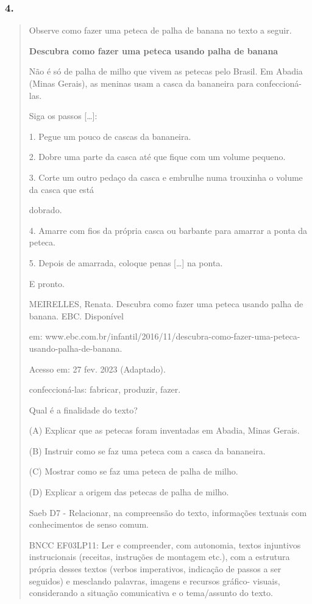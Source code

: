 \subsubsection{4. }\label{section-87}

\begin{quote}
Observe como fazer uma peteca de palha de banana no texto a seguir.

\textbf{Descubra como fazer uma peteca usando palha de banana}

Não é só de palha de milho que vivem as petecas pelo Brasil. Em Abadia
(Minas Gerais), as meninas usam a casca da bananeira para
confeccioná-las.

Siga os passos {[}\ldots{}{]}:

1. Pegue um pouco de cascas da bananeira.

2. Dobre uma parte da casca até que fique com um volume pequeno.

3. Corte um outro pedaço da casca e embrulhe numa trouxinha o volume da
casca que está

dobrado.

4. Amarre com fios da própria casca ou barbante para amarrar a ponta da
peteca.

5. Depois de amarrada, coloque penas {[}\ldots{}{]} na ponta.

E pronto.

MEIRELLES, Renata. Descubra como fazer uma peteca usando palha de
banana. EBC. Disponível

em:
www.ebc.com.br/infantil/2016/11/descubra-como-fazer-uma-peteca-usando-palha-de-banana.

Acesso em: 27 fev. 2023 (Adaptado).

confeccioná-las: fabricar, produzir, fazer.

Qual é a finalidade do texto?

(A) Explicar que as petecas foram inventadas em Abadia, Minas Gerais.

(B) Instruir como se faz uma peteca com a casca da bananeira.

(C) Mostrar como se faz uma peteca de palha de milho.

(D) Explicar a origem das petecas de palha de milho.

Saeb D7 - Relacionar, na compreensão do texto, informações textuais com
conhecimentos de senso comum.

BNCC EF03LP11: Ler e compreender, com autonomia, textos injuntivos
instrucionais (receitas, instruções de montagem etc.), com a estrutura
própria desses textos (verbos imperativos, indicação de passos a ser
seguidos) e mesclando palavras, imagens e recursos gráfico- visuais,
considerando a situação comunicativa e o tema/assunto do texto.


\end{quote}
